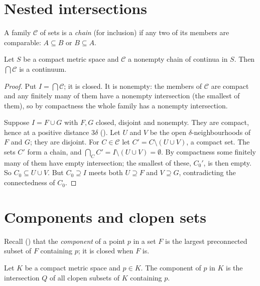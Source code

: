 
\section{Nested intersections}

A family $\mathcal C$ of sets is a \emph{chain} (for inclusion) if any two of its members are
comparable: $A\subseteq B$ or $B\subseteq A$.

\begin{lemma}\label{lem:nested}
Let $S$ be a compact metric space and $\mathcal C$ a nonempty chain of continua in $S$. Then
$\bigcap\mathcal C$ is a continuum.
\end{lemma}

\begin{proof}
Put $I=\bigcap\mathcal C$; it is closed. It is nonempty: the members of $\mathcal C$ are compact and
any finitely many of them have a nonempty intersection (the smallest of them), so by compactness
the whole family has a nonempty intersection.

Suppose $I=F\cup G$ with $F,G$ closed, disjoint and nonempty. They are compact, hence at a positive
distance $3\delta$ (). Let $U$ and $V$ be the open $\delta$-neighbourhoods of $F$
and $G$; they are disjoint. For $C\in\mathcal C$ let $C'=C\setminus(U\cup V)$, a compact set. The
sets $C'$ form a chain, and $\bigcap_{C}C'=I\setminus(U\cup V)=\emptyset$. By compactness some finitely
many of them have empty intersection; the smallest of these, $C_0'$, is then empty. So
$C_0\subseteq U\cup V$. But $C_0\supseteq I$ meets both $U\supseteq F$ and $V\supseteq G$, contradicting
the connectedness of $C_0$.
\end{proof}


\section{Components and clopen sets}

Recall () that the \emph{component} of a point $p$ in a set $F$ is the largest
preconnected subset of $F$ containing $p$; it is closed when $F$ is.

\begin{lemma}\label{lem:quasi}
Let $K$ be a compact metric space and $p\in K$. The component of $p$ in $K$ is the intersection
$Q$ of all clopen subsets of $K$ containing $p$.
\end{lemma}

